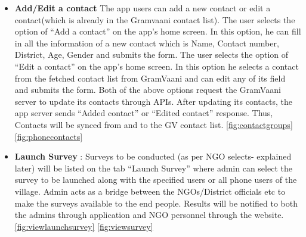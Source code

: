 \begin{itemize}
\item \textbf{Add/Edit a contact}
The app users can add a new contact or edit a contact(which is already in the Gramvaani
contact list). The user selects the option of “Add a contact” on the app’s home screen. In this option, he can fill in all the information of a new contact which is Name, Contact number, District, Age, Gender and submits the form.
The user selects the option of “Edit a contact” on the app’s home screen. In this option he selects a contact from the fetched contact list from GramVaani and can edit any of its field and submits the form.
Both of the above options request the GramVaani server to update its contacts through
APIs. After updating its contacts, the app server sends “Added contact” or “Edited
contact” response. Thus, Contacts will be synced from and to the GV contact list. \ref{fig:contactgroups} \ref{fig:phonecontacts}

\item \textbf{Launch Survey} :
Surveys to be conducted (as per NGO selects- explained later) will be listed on the tab
“Launch Survey” where admin can select the survey to be launched along with the specified
users or all phone users of the village. Admin acts as a bridge between the NGOs/District
officials etc to make the surveys available to the end people. Results will be notified to
both the admins through application and NGO personnel through the website. \ref{fig:viewlaunchsurvey} \ref{fig:viewsurvey}
	
\end{itemize}






